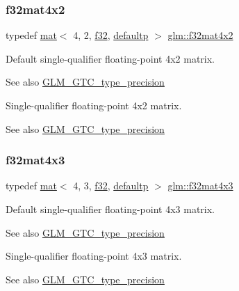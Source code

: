 \subsubsection{\texorpdfstring{f32mat4x2}{f32mat4x2}}
{\footnotesize\ttfamily typedef \mbox{\hyperlink{structglm_1_1mat}{mat}}$<$ 4, 2, \mbox{\hyperlink{group__gtc__type__precision_ga0ec999b57f5330d9021256e96038df04}{f32}}, \mbox{\hyperlink{namespaceglm_a36ed105b07c7746804d7fdc7cc90ff25a9d21ccd8b5a009ec7eb7677befc3bf51}{defaultp}} $>$ \mbox{\hyperlink{group__gtc__type__precision_gab0498cc84bb77002f41630e3cd0be87b}{glm\+::f32mat4x2}}}

Default single-\/qualifier floating-\/point 4x2 matrix. \begin{DoxySeeAlso}{See also}
\mbox{\hyperlink{group__gtc__type__precision}{G\+L\+M\+\_\+\+G\+T\+C\+\_\+type\+\_\+precision}}
\end{DoxySeeAlso}
Single-\/qualifier floating-\/point 4x2 matrix. \begin{DoxySeeAlso}{See also}
\mbox{\hyperlink{group__gtc__type__precision}{G\+L\+M\+\_\+\+G\+T\+C\+\_\+type\+\_\+precision}} 
\end{DoxySeeAlso}
\mbox{\label{group__gtc__type__precision_ga74544c9bd76adba0e7767b6b2a574d0f}} 
\subsubsection{\texorpdfstring{f32mat4x3}{f32mat4x3}}
{\footnotesize\ttfamily typedef \mbox{\hyperlink{structglm_1_1mat}{mat}}$<$ 4, 3, \mbox{\hyperlink{group__gtc__type__precision_ga0ec999b57f5330d9021256e96038df04}{f32}}, \mbox{\hyperlink{namespaceglm_a36ed105b07c7746804d7fdc7cc90ff25a9d21ccd8b5a009ec7eb7677befc3bf51}{defaultp}} $>$ \mbox{\hyperlink{group__gtc__type__precision_ga74544c9bd76adba0e7767b6b2a574d0f}{glm\+::f32mat4x3}}}

Default single-\/qualifier floating-\/point 4x3 matrix. \begin{DoxySeeAlso}{See also}
\mbox{\hyperlink{group__gtc__type__precision}{G\+L\+M\+\_\+\+G\+T\+C\+\_\+type\+\_\+precision}}
\end{DoxySeeAlso}
Single-\/qualifier floating-\/point 4x3 matrix. \begin{DoxySeeAlso}{See also}
\mbox{\hyperlink{group__gtc__type__precision}{G\+L\+M\+\_\+\+G\+T\+C\+\_\+type\+\_\+precision}} 
\end{DoxySeeAlso}
\mbox{\label{group__gtc__type__precision_ga2ba95a5c37eef05b26ac10e03daa5c84}} 
